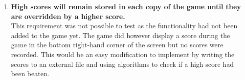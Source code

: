 \begin{enumerate}
\item \textbf{High scores will remain stored in each copy of the game until they are overridden by a higher score.}\\
This requirement was not possible to test as the functionality had not been added to the game yet. The game did however display a score during the game in the bottom right-hand corner of the screen but no scores were recorded. This would be an easy modification to implement by writing the scores to an external file and using algorithms to check if a high score had been beaten.
\end{enumerate}